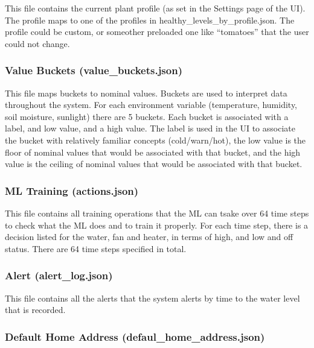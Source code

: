 \documentclass[
]{article}
\begin{document}
This file contains the current plant profile (as set in the Settings
page of the UI). The profile maps to one of the profiles in
healthy\_levels\_by\_profile.json. The profile could be custom, or
someother preloaded one like ``tomatoes'' that the user could not
change.

\hypertarget{value-buckets-value_buckets.json}{%
\subsubsection{Value Buckets
(value\_buckets.json)}\label{value-buckets-value_buckets.json}}

This file maps buckets to nominal values. Buckets are used to interpret
data throughout the system. For each environment variable (temperature,
humidity, soil moisture, sunlight) there are 5 buckets. Each bucket is
associated with a label, and low value, and a high value. The label is
used in the UI to associate the bucket with relatively familiar concepts
(cold/warn/hot), the low value is the floor of nominal values that would
be associated with that bucket, and the high value is the ceiling of
nominal values that would be associated with that bucket.

\hypertarget{ml-training-actions.json}{%
\subsubsection{ML Training
(actions.json)}\label{ml-training-actions.json}}

This file contains all training operations that the ML can tsake over 64
time steps to check what the ML does and to train it properly. For each
time step, there is a decision listed for the water, fan and heater, in
terms of high, and low and off status. There are 64 time steps specified
in total.

\hypertarget{alert-alert_log.json}{%
\subsubsection{Alert (alert\_log.json)}\label{alert-alert_log.json}}

This file contains all the alerts that the system alerts by time to the
water level that is recorded.

\hypertarget{default-home-address-defaul_home_address.json}{%
\subsubsection{Default Home Address
(defaul\_home\_address.json)}\label{default-home-address-defaul_home_address.json}}
\end{document}
